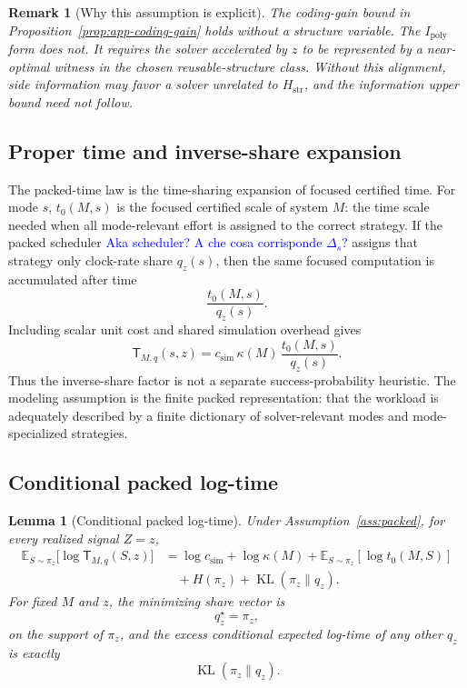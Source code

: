 \documentclass{article}
\newtheorem{lemma}{Lemma}
\newtheorem{remark}{Remark}
\DeclareMathOperator{\KL}{KL}
\newcommand{\E}{\mathbb{E}}
\begin{document}
\begin{remark}[Why this assumption is explicit]
The coding-gain bound in Proposition~\ref{prop:app-coding-gain} holds without a structure
variable.  The \(I_{\mathrm{poly}}\) form does not.  It requires the solver accelerated by
\(z\) to be represented by a near-optimal witness in the chosen reusable-structure class.
Without this alignment, side information may favor a solver unrelated to
\(H_{\mathrm{str}}\), and the information upper bound need not follow.
\end{remark}

\subsection{Proper time and inverse-share expansion}
\label{app:proper-time-inverse-share}

The packed-time law is the time-sharing expansion of focused certified time.
For mode \(s\), \(t_0(M,s)\) is the focused certified scale of system \(M\): the time
scale needed when all mode-relevant effort is assigned to the correct strategy.
If the packed scheduler \textcolor{blue}{Aka scheduler? A che cosa corrisponde $\Delta_s$?} assigns that strategy only clock-rate share \(q_z(s)\), then the
same focused computation is accumulated after time
\[
    \frac{t_0(M,s)}{q_z(s)}.
\]
Including scalar unit cost and shared simulation overhead gives
\[
    \mathsf T_{M,q}(s,z)
    =
    c_{\mathrm{sim}}\,
    \kappa(M)\,
    \frac{t_0(M,s)}{q_z(s)}.
\]
Thus the inverse-share factor is not a separate success-probability heuristic.
The modeling assumption is the finite packed representation: that the workload is
adequately described by a finite dictionary of solver-relevant modes and mode-specialized
strategies.

\subsection{Conditional packed log-time}

\begin{lemma}[Conditional packed log-time]
\label{lem:app-conditional-packed}
Under Assumption~\ref{ass:packed}, for every realized signal \(Z=z\),
\[
\begin{aligned}
    \E_{S\sim\pi_z}
    \bigl[
        \log \mathsf T_{M,q}(S,z)
    \bigr]
    &=
    \log c_{\mathrm{sim}}
    +
    \log\kappa(M)
    +
    \E_{S\sim\pi_z}[\log t_0(M,S)]
    \\
    &\quad
    +
    H(\pi_z)
    +
    \KL(\pi_z\|q_z).
\end{aligned}
\]
For fixed \(M\) and \(z\), the minimizing share vector is
\[
    q_z^\star=\pi_z,
\]
on the support of \(\pi_z\), and the excess conditional expected log-time of any other
\(q_z\) is exactly
\[
    \KL(\pi_z\|q_z).
\]
\end{lemma}
\end{document}
